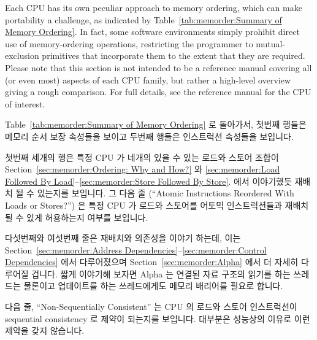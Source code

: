 Each CPU has its own peculiar approach to memory ordering, which
can make portability a challenge, as indicated by
Table~\ref{tab:memorder:Summary of Memory Ordering}.
In fact, some software environments simply prohibit
direct use of memory-ordering operations, restricting the programmer
to mutual-exclusion primitives that incorporate them to the extent that
they are required.  Please note that this section is not intended to be
a reference manual
covering all (or even most) aspects of each CPU family, but rather
a high-level overview giving a rough comparison.
For full details, see the reference manual for the CPU of interest.
\fi

Table~\ref{tab:memorder:Summary of Memory Ordering} 로 돌아가서, 첫번째 행들은
메모리 순서 보장 속성들을 보이고 두번째 행들은 인스트럭션 속성들을 보입니다.

첫번째 세개의 행은 특정 CPU 가 네개의 있을 수 있는 로드와 스토어 조합이
Section~\ref{sec:memorder:Ordering: Why and How?} 와
\ref{sec:memorder:Load Followed By Load}--\ref{sec:memorder:Store Followed By Store}.
에서 이야기했듯 재배치 될 수 있는지를 보입니다.
그 다음 줄 (``Atomic Instructions Reordered With Loads or Stores?'') 은 특정
CPU 가 로드와 스토어를 어토믹 인스트럭션들과 재배치 될 수 있게 허용하는지
여부를 보입니다.

다섯번째와 여섯번째 줄은 재배치와 의존성을 이야기 하는데, 이는
Section~\ref{sec:memorder:Address Dependencies}--\ref{sec:memorder:Control Dependencies}
에서 다루어졌으며
Section~\ref{sec:memorder:Alpha} 에서 더 자세히 다루어질 겁니다.
짧게 이야기해 보자면 Alpha 는 연결된 자료 구조의 읽기를 하는 쓰레드는 물론이고
업데이트를 하는 쓰레드에게도 메모리 배리어를 필요로 합니다.

다음 줄, ``Non-Sequentially Consistent'' 는 CPU 의 로드와 스토어 인스트럭션이
sequential consistency 로 제약이 되는지를 보입니다.
대부분은 성능상의 이유로 이런 제약을 갖지 않습니다.
\iffalse

